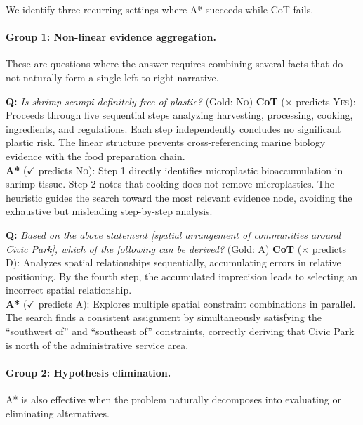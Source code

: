 \documentclass{article}
\begin{document}
We identify three recurring settings where A* succeeds while CoT fails.

\paragraph{Group 1: Non-linear evidence aggregation.}
These are questions where the answer requires combining several facts that do not naturally form a single left-to-right narrative.

\begin{examplebox}[title=StrategyQA --- Non-linear Evidence Aggregation]
\textbf{Q:} \emph{Is shrimp scampi definitely free of plastic?} \quad (Gold: \textsc{No})
\tcblower
\textbf{CoT} ($\times$ predicts \textsc{Yes}): Proceeds through five sequential steps analyzing harvesting, processing, cooking, ingredients, and regulations. Each step independently concludes no significant plastic risk. The linear structure prevents cross-referencing marine biology evidence with the food preparation chain.\\[4pt]
\textbf{A*} ($\checkmark$ predicts \textsc{No}): Step 1 directly identifies microplastic bioaccumulation in shrimp tissue. Step 2 notes that cooking does not remove microplastics. The heuristic guides the search toward the most relevant evidence node, avoiding the exhaustive but misleading step-by-step analysis.
\end{examplebox}

\begin{examplebox}[title=LogicQA --- Non-linear Evidence Aggregation]
\textbf{Q:} \emph{Based on the above statement [spatial arrangement of communities around Civic Park], which of the following can be derived?} \quad (Gold: A)
\tcblower
\textbf{CoT} ($\times$ predicts D): Analyzes spatial relationships sequentially, accumulating errors in relative positioning. By the fourth step, the accumulated imprecision leads to selecting an incorrect spatial relationship.\\[4pt]
\textbf{A*} ($\checkmark$ predicts A): Explores multiple spatial constraint combinations in parallel. The search finds a consistent assignment by simultaneously satisfying the ``southwest of'' and ``southeast of'' constraints, correctly deriving that Civic Park is north of the administrative service area.
\end{examplebox}

\paragraph{Group 2: Hypothesis elimination.}
A* is also effective when the problem naturally decomposes into evaluating or eliminating alternatives.
\end{document}
